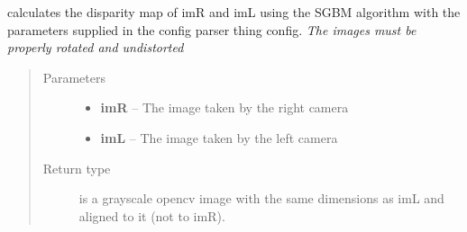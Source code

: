 \documentclass[a4paper,10pt,openany,oneside]{sphinxmanual}
\begin{document}
\begin{fulllineitems}
\label{index:scripts.image_processing.calculateDisparityMap}
calculates the disparity map of imR and imL using the SGBM algorithm
with the parameters supplied in the config parser thing config.
\emph{The images must be properly rotated and undistorted}
\begin{quote}\begin{description}
\item[{Parameters}] \leavevmode\begin{itemize}
\item {}
\textbf{imR} -- The image taken by the right camera

\item {}
\textbf{imL} -- The image taken by the left camera

\end{itemize}

\item[{Return type}] \leavevmode
{} is a grayscale opencv image with the same dimensions as imL and aligned to it (not to imR).

\end{description}\end{quote}

\end{fulllineitems}

\end{document}

